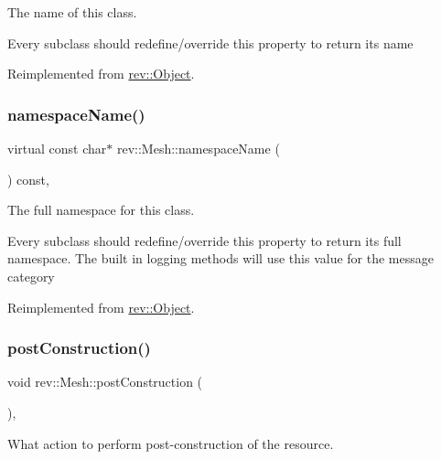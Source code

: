 The name of this class. 

Every subclass should redefine/override this property to return its name 

Reimplemented from \mbox{\hyperlink{classrev_1_1_object_a7a2013f91169479b65cf93afdc5d9a68}{rev\+::\+Object}}.

\mbox{\label{classrev_1_1_mesh_a38ad31454bc3e4e1d7d4d10b4cf36f83}} 
\subsubsection{\texorpdfstring{namespaceName()}{namespaceName()}}
{\footnotesize\ttfamily virtual const char$\ast$ rev\+::\+Mesh\+::namespace\+Name (\begin{DoxyParamCaption}{ }\end{DoxyParamCaption}) const\hspace{0.3cm}{\ttfamily [inline]}, {\ttfamily [virtual]}}



The full namespace for this class. 

Every subclass should redefine/override this property to return its full namespace. The built in logging methods will use this value for the message category 

Reimplemented from \mbox{\hyperlink{classrev_1_1_object_aaeb638d3e10f361c56c211a318a27f3d}{rev\+::\+Object}}.

\mbox{\label{classrev_1_1_mesh_a66d46be8133030a0a02911d9def03f47}} 
\subsubsection{\texorpdfstring{postConstruction()}{postConstruction()}}
{\footnotesize\ttfamily void rev\+::\+Mesh\+::post\+Construction (\begin{DoxyParamCaption}{ }\end{DoxyParamCaption})\hspace{0.3cm}{\ttfamily [override]}, {\ttfamily [virtual]}}



What action to perform post-\/construction of the resource. 

